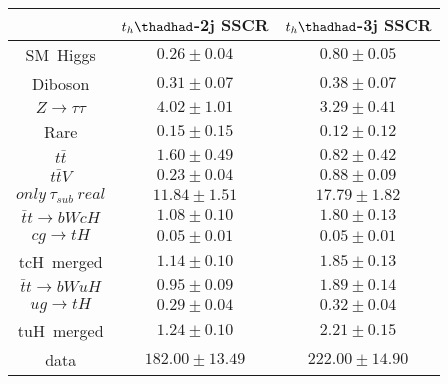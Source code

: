 \centering
\begin{tabular}{ccc} \toprule\toprule
& $t_{h}\thadhad$-2j SSCR  & $t_{h}\thadhad$-3j SSCR\\ \midrule
\hspace{9mm} SM~Higgs                & $0.26\pm0.04$                        & $0.80\pm0.05$\\
\hspace{9mm} Diboson                 & $0.31\pm0.07$                        & $0.38\pm0.07$\\
\hspace{9mm} $Z\to\tau\tau$          & $4.02\pm1.01$                        & $3.29\pm0.41$\\
\hspace{9mm} Rare                    & $0.15\pm0.15$                        & $0.12\pm0.12$\\
\hspace{9mm} $t\bar{t}$              & $1.60\pm0.49$                        & $0.82\pm0.42$\\
\hspace{9mm} $t\bar{t}V$             & $0.23\pm0.04$                        & $0.88\pm0.09$\\
\hspace{9mm} $only~\tau_{sub}~real$  & $11.84\pm1.51$                       & $17.79\pm1.82$\\\midrule
\hspace{9mm} $\bar{t}t\to bWcH$      & $1.08\pm0.10$                        & $1.80\pm0.13$\\
\hspace{9mm} $cg\to tH$              & $0.05\pm0.01$                        & $0.05\pm0.01$\\
tcH~merged              & $1.14\pm0.10$                        & $1.85\pm0.13$\\
\hspace{9mm} $\bar{t}t\to bWuH$      & $0.95\pm0.09$                        & $1.89\pm0.14$\\
\hspace{9mm} $ug\to tH$              & $0.29\pm0.04$                        & $0.32\pm0.04$\\
tuH~merged              & $1.24\pm0.10$                        & $2.21\pm0.15$\\\midrule
data                    & $182.00\pm13.49$                     & $222.00\pm14.90$\\
\bottomrule\bottomrule
\end{tabular}
